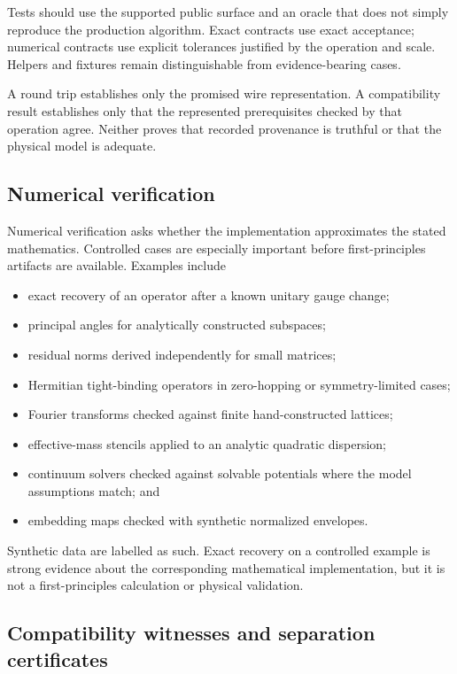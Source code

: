 Tests should use the supported public surface and an oracle that does not simply
reproduce the production algorithm. Exact contracts use exact acceptance;
numerical contracts use explicit tolerances justified by the operation and
scale. Helpers and fixtures remain distinguishable from evidence-bearing cases.

A round trip establishes only the promised wire representation. A compatibility
result establishes only that the represented prerequisites checked by that
operation agree. Neither proves that recorded provenance is truthful or that the
physical model is adequate.

\subsection{Numerical verification}


Numerical verification asks whether the implementation approximates the stated
mathematics. Controlled cases are especially important before first-principles
artifacts are available. Examples include

\begin{itemize}
  \item exact recovery of an operator after a known unitary gauge change;
  \item principal angles for analytically constructed subspaces;
  \item residual norms derived independently for small matrices;
  \item Hermitian tight-binding operators in zero-hopping or symmetry-limited
    cases;
  \item Fourier transforms checked against finite hand-constructed lattices;
  \item effective-mass stencils applied to an analytic quadratic dispersion;
  \item continuum solvers checked against solvable potentials where the model
    assumptions match; and
  \item embedding maps checked with synthetic normalized envelopes.
\end{itemize}

Synthetic data are labelled as such. Exact recovery on a controlled example is
strong evidence about the corresponding mathematical implementation, but it is
not a first-principles calculation or physical validation.

\subsection{Compatibility witnesses and separation certificates}

